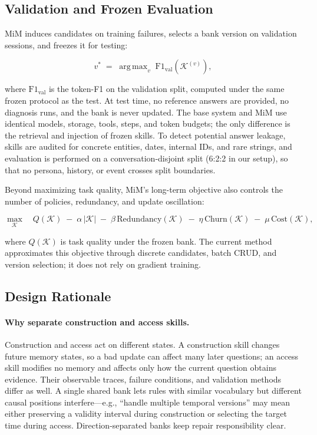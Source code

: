 \documentclass[11pt]{article}
\newcommand{\KK}{\mathcal{K}}
\DeclareMathOperator*{\argmax}{arg\,max}
\begin{document}
\subsection{Validation and Frozen Evaluation}
\label{sec:method-validation}

MiM induces candidates on training failures, selects a bank version on
validation sessions, and freezes it for testing:

\begin{equation}
\label{eq:select}
v^{*} \;=\; \argmax_{v}\; \mathrm{F1}_{\mathrm{val}}\!\left(\KK^{(v)}\right),
\end{equation}

\noindent where $\mathrm{F1}_{\mathrm{val}}$ is the token-F1 on the validation
split, computed under the same frozen protocol as the test. At test time, no
reference answers are provided, no diagnosis runs, and the bank is never
updated. The base system and MiM use identical models, storage, tools, steps,
and token budgets; the only difference is the retrieval and injection of frozen
skills. To detect potential answer leakage, skills are audited for concrete
entities, dates, internal IDs, and rare strings, and evaluation is performed on
a conversation-disjoint split (6:2:2 in our setup), so that no persona, history,
or event crosses split boundaries.

Beyond maximizing task quality, MiM's long-term objective also controls the
number of policies, redundancy, and update oscillation:

\begin{equation}
\label{eq:objective}
\max_{\KK} \quad Q(\KK) \;-\; \alpha\,|\KK| \;-\; \beta\,\mathrm{Redundancy}(\KK)
\;-\; \eta\,\mathrm{Churn}(\KK) \;-\; \mu\,\mathrm{Cost}(\KK),
\end{equation}

\noindent where $Q(\KK)$ is task quality under the frozen bank. The current
method approximates this objective through discrete candidates, batch CRUD, and
version selection; it does not rely on gradient training.

\subsection{Design Rationale}
\label{sec:method-rationale}

\paragraph{Why separate construction and access skills.}
Construction and access act on different states. A construction skill changes
future memory states, so a bad update can affect many later questions; an access
skill modifies no memory and affects only how the current question obtains
evidence. Their observable traces, failure conditions, and validation methods
differ as well. A single shared bank lets rules with similar vocabulary but
different causal positions interfere---e.g., ``handle multiple temporal
versions'' may mean either preserving a validity interval during construction or
selecting the target time during access. Direction-separated banks keep repair
responsibility clear.
\end{document}
